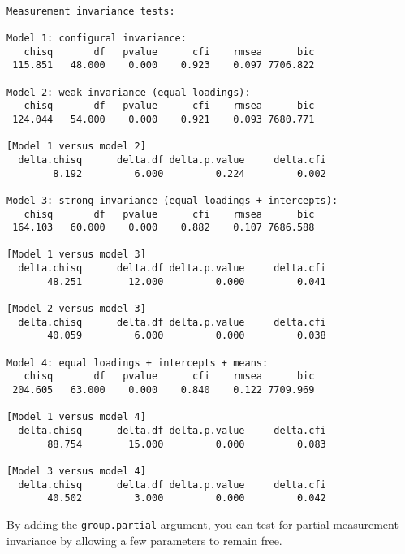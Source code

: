 \begin{verbatim}

Measurement invariance tests:

Model 1: configural invariance:
   chisq       df   pvalue      cfi    rmsea      bic 
 115.851   48.000    0.000    0.923    0.097 7706.822 

Model 2: weak invariance (equal loadings):
   chisq       df   pvalue      cfi    rmsea      bic 
 124.044   54.000    0.000    0.921    0.093 7680.771 

[Model 1 versus model 2]
  delta.chisq      delta.df delta.p.value     delta.cfi 
        8.192         6.000         0.224         0.002 

Model 3: strong invariance (equal loadings + intercepts):
   chisq       df   pvalue      cfi    rmsea      bic 
 164.103   60.000    0.000    0.882    0.107 7686.588 

[Model 1 versus model 3]
  delta.chisq      delta.df delta.p.value     delta.cfi 
       48.251        12.000         0.000         0.041 

[Model 2 versus model 3]
  delta.chisq      delta.df delta.p.value     delta.cfi 
       40.059         6.000         0.000         0.038 

Model 4: equal loadings + intercepts + means:
   chisq       df   pvalue      cfi    rmsea      bic 
 204.605   63.000    0.000    0.840    0.122 7709.969 

[Model 1 versus model 4]
  delta.chisq      delta.df delta.p.value     delta.cfi 
       88.754        15.000         0.000         0.083 

[Model 3 versus model 4]
  delta.chisq      delta.df delta.p.value     delta.cfi 
       40.502         3.000         0.000         0.042 
\end{verbatim}

By adding the \texttt{group.partial} argument, you can test for partial
measurement invariance by allowing a few parameters to remain free.
